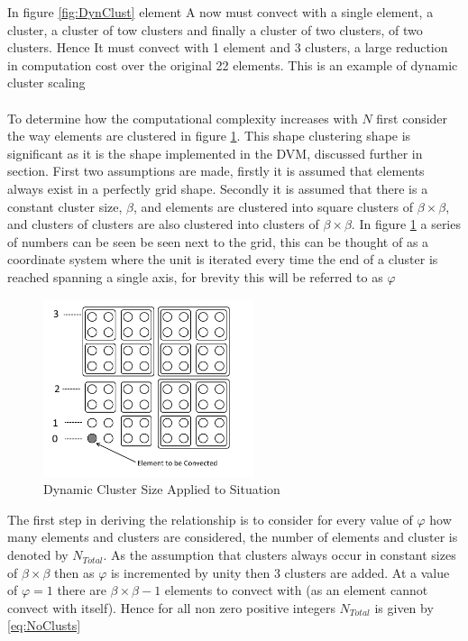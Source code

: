 In figure \ref{fig:DynClust} element A now must convect with a single element, a cluster, a cluster of tow clusters and finally a cluster of two clusters, of two clusters. Hence It must convect with 1 element and 3 clusters, a large reduction in computation cost over the original 22 elements. This is an example of dynamic cluster scaling
\\\\
To determine how the computational complexity increases with $N$ first consider the way elements are clustered in figure \ref{fig:ClustDerv}. This shape clustering shape is significant as it is the shape implemented in the DVM, discussed further in section. First two assumptions are made, firstly it is assumed that elements always exist in a perfectly grid shape. Secondly it is assumed that there is a constant cluster size, $\beta$, and elements are clustered into square clusters of $\beta\times\beta$, and clusters of clusters are also clustered into clusters of $\beta\times\beta$. 
In figure \ref{fig:ClustDerv} a series of numbers can be seen be seen next to the grid, this can be thought of as a coordinate system where the unit is iterated every time the end of a cluster is reached spanning a single axis, for brevity this will be referred to as $\varphi$

\begin{figure}[H]
\centering
\includegraphics[width=0.55\textwidth]{Figures/DynamicClusterDerivation.png}
\caption{\label{fig:ClustDerv}Dynamic Cluster Size Applied to Situation}
\end{figure}

The first step in deriving the relationship is to consider for every value of $\varphi$ how many elements and clusters are considered, the number of elements and cluster is denoted by $N_{Total}$. As the assumption that clusters always occur in constant sizes of $\beta\times\beta$ then as $\varphi$ is incremented by unity then 3 clusters are added. At a value of $\varphi=1$ there are $\beta\times\beta-1$ elements to convect with (as an element cannot convect with itself). Hence for all non zero positive integers $N_{Total}$ is given by \ref{eq:NoClusts}


